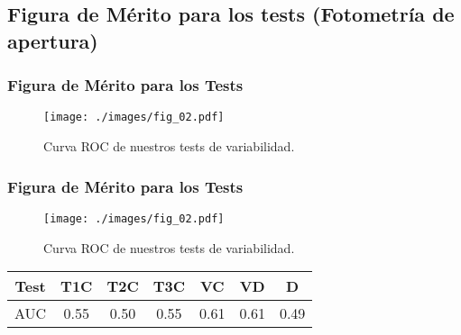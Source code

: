 \documentclass[10pt]{beamer}
\begin{document}
\subsection{Figura de M\'erito para los tests (Fotometr\'{i}a de apertura)}
\begin{frame}\frametitle{Figura de M\'erito para los Tests}
 \begin{figure}
 \centering
 \texttt{[image: ./images/fig\_02.pdf]}
 \caption{\scriptsize{Curva ROC de nuestros tests de variabilidad.}}
\end{figure}
\end{frame}
\begin{frame}\frametitle{Figura de M\'erito para los Tests}
 \begin{figure}
 \centering
 \texttt{[image: ./images/fig\_02.pdf]}
 \caption{\scriptsize{Curva ROC de nuestros tests de variabilidad.}}
\end{figure}
\begin{center}
\begin{tabular}{|c|c|c|c|c|c|c|}
\hline
Test & T1C & T2C & T3C & VC & VD & D\\
\hline %
AUC & 0.55 & 0.50 & 0.55 & 0.61 & 0.61 & 0.49\\
\hline
\end{tabular}
\end{center}
\end{frame}
\end{document}
